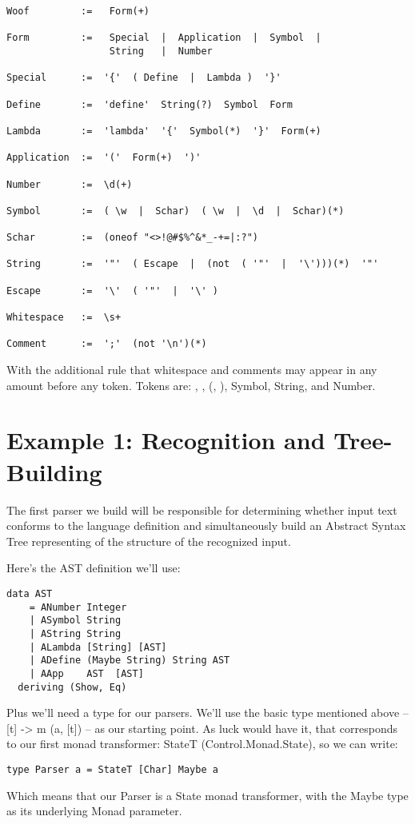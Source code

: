 \documentclass{tmr}
\begin{document}
\begin{verbatim}
Woof         :=   Form(+)

Form         :=   Special  |  Application  |  Symbol  |  
                  String   |  Number

Special      :=  '{'  ( Define  |  Lambda )  '}'

Define       :=  'define'  String(?)  Symbol  Form

Lambda       :=  'lambda'  '{'  Symbol(*)  '}'  Form(+)

Application  :=  '('  Form(+)  ')'

Number       :=  \d(+)

Symbol       :=  ( \w  |  Schar)  ( \w  |  \d  |  Schar)(*)

Schar        :=  (oneof "<>!@#$%^&*_-+=|:?")

String       :=  '"'  ( Escape  |  (not  ( '"'  |  '\')))(*)  '"'

Escape       :=  '\'  ( '"'  |  '\' )

Whitespace   :=  \s+

Comment      :=  ';'  (not '\n')(*)
\end{verbatim}
With the additional rule that whitespace and comments 
may appear in any amount before any token.
Tokens are:  {, }, (, ), Symbol, String, and Number.



\section{Example 1: Recognition and Tree-Building}
The first parser we build will be responsible for determining whether input
text conforms to the language definition and simultaneously build an 
Abstract Syntax Tree representing of the structure of the recognized input.

Here's the AST definition we'll use:
\begin{verbatim}
data AST
    = ANumber Integer
    | ASymbol String
    | AString String
    | ALambda [String] [AST]
    | ADefine (Maybe String) String AST
    | AApp    AST  [AST]
  deriving (Show, Eq)
\end{verbatim}
Plus we'll need a type for our parsers.  We'll use the basic type mentioned 
above -- [t] -> m (a, [t]) -- as our starting point.  As luck would have it, that
corresponds to our first monad transformer:  StateT (Control.Monad.State), so we
can write:
\begin{verbatim}
type Parser a = StateT [Char] Maybe a
\end{verbatim}
Which means that our Parser is a State monad transformer, with the Maybe type
as its underlying Monad parameter.
\end{document}
